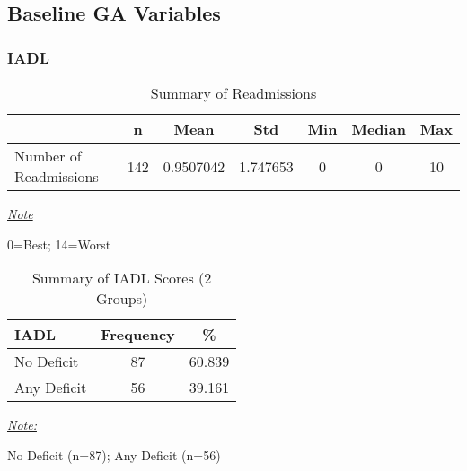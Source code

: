 \documentclass[12pt,]{article}
\begin{document}
\pagebreak

\subsection{Baseline GA Variables}\label{baseline-ga-variables}

\subsubsection{IADL}\label{iadl}

\begin{table}[!h]

\caption{\label{tab:unnamed-chunk-11}Summary of Readmissions}
\centering
\begin{threeparttable}
\begin{tabular}{>{\raggedright\arraybackslash}p{5cm}cccccc}
\toprule
  & n & Mean & Std & Min & Median & Max\\
\midrule
\rowcolor{white}  Number of Readmissions & 142 & 0.9507042 & 1.747653 & 0 & 0 & 10\\
\bottomrule
\end{tabular}
\begin{tablenotes}[para]
\item \underline{\textit{Note}} 
\item 0=Best; 14=Worst
\end{tablenotes}
\end{threeparttable}
\end{table}

\begin{table}[!h]

\caption{\label{tab:unnamed-chunk-11}Summary of IADL Scores (2 Groups)}
\centering
\begin{threeparttable}
\begin{tabular}{>{\centering\arraybackslash}p{5cm}cc}
\toprule
IADL & Frequency & \%\\
\midrule
No Deficit & 87 & 60.839\\
\rowcolor[HTML]{E3E5E7}  Any Deficit & 56 & 39.161\\
\bottomrule
\end{tabular}
\begin{tablenotes}[para]
\item \underline{\textit{Note:}} 
\item No Deficit (n=87); Any Deficit (n=56)
\end{tablenotes}
\end{threeparttable}
\end{table}
\end{document}
